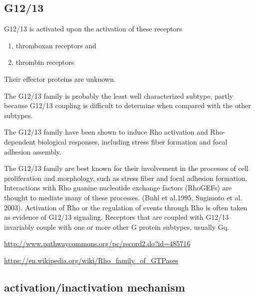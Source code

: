 \subsection{G12/13}
\label{sec:G12/13-protein}

G12/13 is activated upon the activation of these receptors
\begin{enumerate}
  \item thromboxan receptors and 
  
  \item thrombin receptors
\end{enumerate}

Their effector proteins are unknown.


The G12/13 family is probably the least well characterized subtype, partly
because G12/13 coupling is difficult to determine when compared with the other
subtypes.

The G12/13 family have been shown to induce Rho activation and Rho-dependent
biological responses, including stress fiber formation and focal adhesion
assembly.

The G12/13 family are best known for their involvement in the processes of cell
proliferation and morphology, such as stress fiber and focal adhesion formation.
Interactions with Rho guanine nucleotide exchange factors (RhoGEFs) are thought
to mediate many of these processes. (Buhl et al.1995, Sugimoto et al. 2003).
Activation of Rho or the regulation of events through Rho is often taken as
evidence of G12/13 signaling. Receptors that are coupled with G12/13 invariably
couple with one or more other G protein subtypes, usually Gq.

\url{http://www.pathwaycommons.org/pc/record2.do?id=485716}

\url{https://en.wikipedia.org/wiki/Rho_family_of_GTPases}

\subsection{activation/inactivation mechanism}
\label{sec:G-proteins_activation-inactivation}

%   
%   

